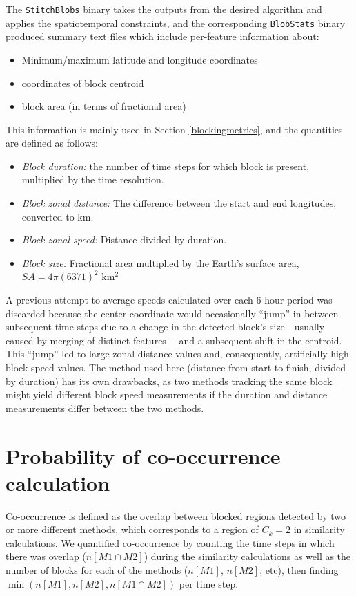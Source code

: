 \documentclass[smallextended]{svjour3}       %
\numberwithin{equation}{section}
\begin{document}
\begin{appendices}
The \texttt{StitchBlobs} binary takes the outputs from the desired algorithm and applies the spatiotemporal constraints, and the corresponding \texttt{BlobStats} binary produced summary text files which include per-feature information about:
\begin{itemize}
\item Minimum/maximum latitude and longitude coordinates
\item coordinates of block centroid
\item block area (in terms of fractional area)
\end{itemize}

This information is mainly used in Section \ref{blockingmetrics}, and the quantities are defined as follows:

\begin{itemize}
\item \textit{Block duration:} the number of time steps for which block is present, multiplied by the time resolution.
\item \textit{Block zonal distance:} The difference between the start and end longitudes, converted to km.
\item \textit{Block zonal speed:} Distance divided by duration.
\item \textit{Block size:} Fractional area multiplied by the Earth's surface area, $SA = 4\pi (6371)^2$ km$^2$
\end{itemize}

A previous attempt to average speeds calculated over each 6 hour period was discarded because the center coordinate would occasionally ``jump'' in between subsequent time steps due to a change in the detected block's size---usually caused by merging of distinct features--- and a subsequent shift in the centroid. This ``jump'' led to large zonal distance values and, consequently, artificially high block speed values. The method used here (distance from start to finish, divided by duration) has its own drawbacks, as two methods tracking the same block might yield different block speed measurements if the duration and distance measurements differ between the two methods.

\section{Probability of co-occurrence calculation}\label{probcalc}

Co-occurrence is defined as the overlap between blocked regions detected by two or more different methods, which corresponds to a region of $C_k=2$ in similarity calculations. We quantified co-occurrence by counting the time steps in which there was overlap ($n[M1\cap  M2]$) during the similarity calculations as well as the number of blocks for each of the methods ($n[M1]$, $n[M2]$, etc), then finding $\min(n[M1],n[M2],n[M1\cap M2])$ per time step.


\end{appendices}
\end{document}

